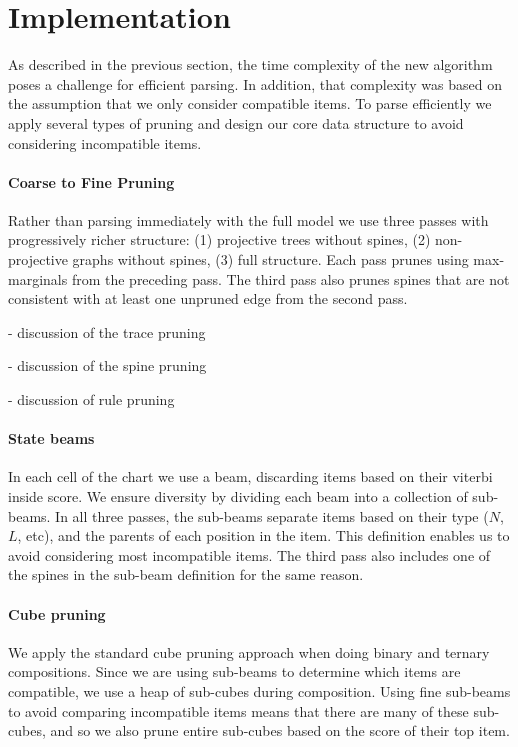 \section{Implementation}

As described in the previous section, the time complexity of the new algorithm poses a challenge for efficient parsing.
In addition, that complexity was based on the assumption that we only consider compatible items.
To parse efficiently we apply several types of pruning and design our core data structure to avoid considering incompatible items.

\paragraph{Coarse to Fine Pruning \parencite{Goodman:1997}}
Rather than parsing immediately with the full model we use three passes with progressively richer structure:
(1) projective trees without spines,
(2) non-projective graphs without spines,
(3) full structure.
Each pass prunes using max-marginals from the preceding pass.
The third pass also prunes spines that are not consistent with at least one unpruned edge from the second pass.

 - discussion of the trace pruning

 - discussion of the spine pruning

 - discussion of rule pruning

\paragraph{State beams}
In each cell of the chart we use a beam, discarding items based on their viterbi inside score.
We ensure diversity by dividing each beam into a collection of sub-beams.
In all three passes, the sub-beams separate items based on their type ($N$, $L$, etc), and the parents of each position in the item.
This definition enables us to avoid considering most incompatible items.
The third pass also includes one of the spines in the sub-beam definition for the same reason.

\paragraph{Cube pruning \parencite{Chiang:2007}}
We apply the standard cube pruning approach when doing binary and ternary compositions.
Since we are using sub-beams to determine which items are compatible, we use a heap of sub-cubes during composition.
Using fine sub-beams to avoid comparing incompatible items means that there are many of these sub-cubes, and so we also prune entire sub-cubes based on the score of their top item.

